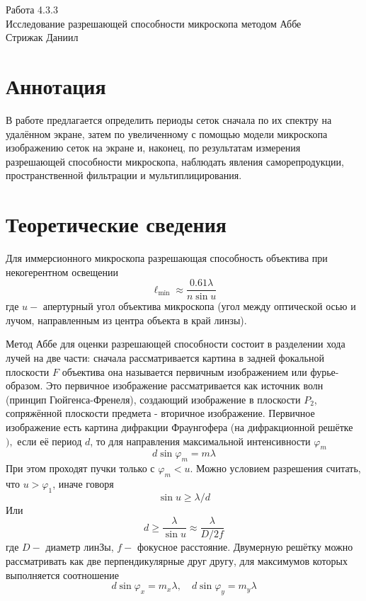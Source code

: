 



\begin{center}
  \LARGE{Работа 4.3.3}\\[0.2cm]
  \LARGE{Исследование разрешающей способности микроскопа методом Аббе}\\[0.2cm]
  \large{Стрижак Даниил}\\[0.2cm]
\end{center}  
  

\section{Аннотация}
В работе предлагается определить периоды сеток сначала по их спектру на удалённом экране, затем по увеличенному с помощью модели микроскопа изображению сеток на экране и, наконец, по результатам измерения разрешающей способности микроскопа, наблюдать явления саморепродукции, пространственной фильтрации и мультиплицирования.

\section{Теоретические сведения}

 Для иммерсионного микроскопа разрешающая способность объектива при некогерентном
освещении
$$
\ell_{\min } \approx \frac{0.61 \lambda}{n \sin u}
$$
где $u-$ апертурный угол объектива микроскопа (угол между оптической осью и лучом, направленным из центра объекта в край линзы).

Метод Аббе для оценки разрешающей способности состоит в разделении хода лучей на две части: сначала рассматривается картина в задней фокальной плоскости $F$ объектива она называется первичным изображением или фурье-образом. Это первичное изображение рассматривается как источник волн (принцип Гюйгенса-Френеля), создающий изображение в плоскости $P_{2}$, сопряжённой плоскости предмета - вторичное изображение. Первичное изображение есть картина дифракции Фраунгофера (на дифракционной решётке $),$ если её период $d$, то для направления максимальной интенсивности $\varphi_{m}$
$$
d \sin \varphi_{m}=m \lambda
$$
При этом проходят пучки только с $\varphi_{m}<u .$ Можно условием разрешения считать, что $u>\varphi_{1}$, иначе говоря
$$
\sin u \geq \lambda / d
$$
Или
$$
d \geq \frac{\lambda}{\sin u} \approx \frac{\lambda}{D / 2 f}
$$
где $D-$ диаметр линЗы, $f-$ фокусное расстояние. Двумерную решётку можно рассматривать как две перпендикулярные друг другу, для максимумов которых выполняется соотношение
$$
d \sin \varphi_{x}=m_{x} \lambda, \quad d \sin \varphi_{y}=m_{y} \lambda
$$


